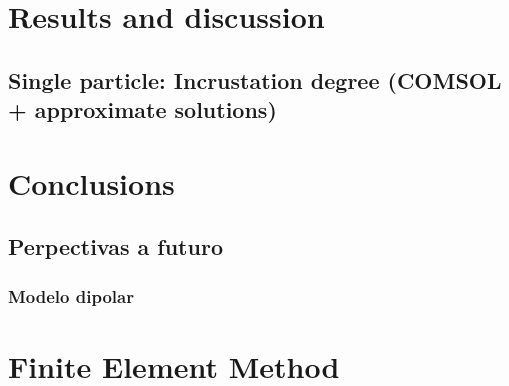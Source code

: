\documentclass[11pt]{Latex/Classes/PhDthesisPSnPDF}
\begin{document}
\chapter{Results and discussion}
	\section{Single particle: Incrustation degree (COMSOL + approximate solutions)}

\chapter{Conclusions}
    \section{Perpectivas a futuro}
        \subsection{Modelo dipolar }
        
\appendix
\chapter{Finite Element Method}
%
%
%	
%
%        
%
%
%  

\setlength{}
\printbibliography

\newpage
\listoffigures

\printindex


           
\end{document}
